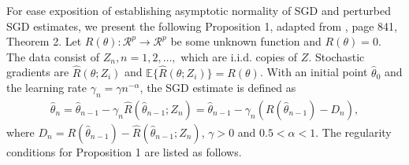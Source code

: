 \documentclass[12pt]{article}
\def\wh{\widehat}
\begin{document}
For ease exposition of establishing
asymptotic normality of SGD and perturbed SGD estimates, we present the following Proposition 1, adapted from \cite{polyak1992acceleration}, page 841, Theorem 2.
Let $R(\theta): \mathcal{R}^p \rightarrow \mathcal{R}^p$ be some unknown function and $R(\theta)=0$.
The data consist of $Z_n, n=1,2,\dots,$ which are i.i.d. copies of $Z$. Stochastic
gradients are  $\wh{R}(\theta; Z_i)$ and $\mathbb{E}\{\wh{R}(\theta; Z_i)\}=R(\theta)$. With an initial point $\wh{\theta}_0$ and the learning rate  $\gamma_n=\gamma n^{-\alpha}$, the SGD estimate is defined as
\begin{eqnarray}
\wh{\theta}_n=\wh{\theta}_{n-1} - \gamma_n \wh{R}(\wh{\theta}_{n-1}; Z_n)=\wh{\theta}_{n-1}-\gamma_n\left(R(\wh{\theta}_{n-1})-D_n\right),
\end{eqnarray}
where $D_n=R(\wh{\theta}_{n-1})-\wh{R}(\wh{\theta}_{n-1}; Z_n)$, $\gamma>0$ and $0.5<\alpha<1$. The regularity conditions for Proposition 1 are
listed as follows.
\end{document}
